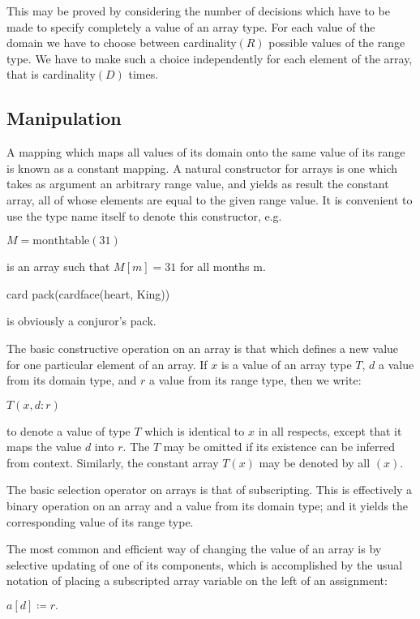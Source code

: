 \noindent
This may be proved by considering the number of decisions which have to be made to specify completely a value of an array type. For each value of the domain we have to choose between cardinality$(R)$ possible values of the range type. We have to make such a choice independently for each element of the array, that is cardinality$(D)$ times.

\subsection{Manipulation}

A mapping which maps all values of its domain onto the same value of its range is known as a constant mapping. A natural constructor for arrays is one which takes as argument an arbitrary range value, and yields as result the constant array, all of whose elements are equal to the given range value. It is convenient to use the type name itself to denote this constructor, e.g.

\quad $M = \text{monthtable}(31)$

\noindent
is an array such that $M[m] = 31$ for all months m.

\quad card pack(cardface(heart, King))

\noindent
is obviously a conjuror's pack.

The basic constructive operation on an array is that which defines a new value for one particular element of an array. If $x$ is a value of an array type $T$, $d$ a value from its domain type, and $r$ a value from its range type, then we write:

\quad $T(x, d:r)$

\noindent
to denote a value of type $T$ which is identical to $x$ in all respects, except that it maps the value $d$ into $r$. The $T$ may be omitted if its existence can be inferred from context. Similarly, the constant array $T(x)$ may be denoted by all $(x)$.

The basic selection operator on arrays is that of subscripting. This is effectively a binary operation on an array and a value from its domain type; and it yields the corresponding value of its range type.

The most common and efficient way of changing the value of an array is by selective updating of one of its components, which is accomplished by the usual notation of placing a subscripted array variable on the left of an assignment:

\quad $a[d]\coloneq r.$

